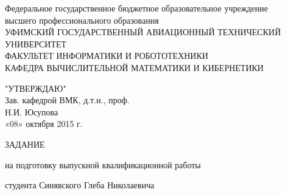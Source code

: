 \begin{titlepage}
\newpage

\begin{center}
Федеральное государственное бюджетное образовательное учреждение\\
высшего профессионального образования \\
\vspace{0.5cm}
УФИМСКИЙ ГОСУДАРСТВЕННЫЙ АВИАЦИОННЫЙ ТЕХНИЧЕСКИЙ УНИВЕРСИТЕТ\\
\vspace{0.5cm}
ФАКУЛЬТЕТ  ИНФОРМАТИКИ  И  РОБОТОТЕХНИКИ \\
\vspace{0.5cm}
КАФЕДРА  ВЫЧИСЛИТЕЛЬНОЙ  МАТЕМАТИКИ  И  КИБЕРНЕТИКИ\\
\vspace{1cm}
\end{center}
\vspace{0.5cm}
\begin{flushright}
"УТВЕРЖДАЮ" \\
Зав. кафедрой  ВМК, д.т.н., проф.\\
\vspace{0.5cm}
\underline{\hspace{5cm}} Н.И. Юсупова\\
«08»    октября  2015  г.
\end{flushright}
\vspace{1cm}

\begin{center}
  \Large{ ЗАДАНИЕ }
\vspace{0.5cm}

на подготовку выпускной квалификационной работы
\end{center}

студента Синявского Глеба Николаевича


\end{titlepage}
